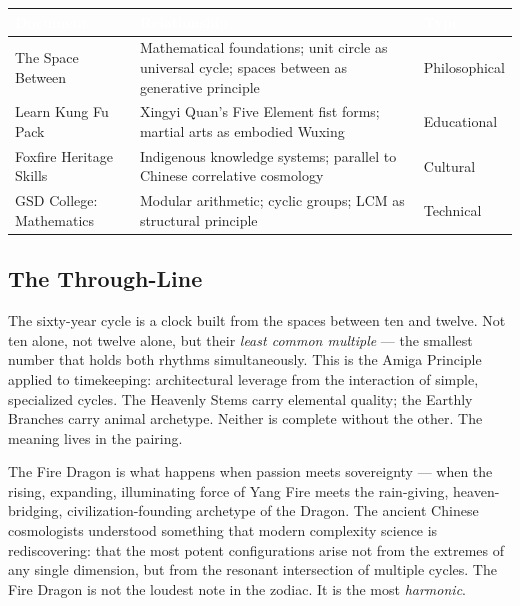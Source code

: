 \documentclass[11pt,letterpaper]{article}
\newcommand{\stageheader}[2]{%
  \noindent\colorbox{#2}{\makebox[\textwidth][l]{%
    \textcolor{white}{\bfseries\sffamily\hspace{6pt}#1\hspace{6pt}}}}%
  \vspace{0.5em}\par%
}
\newcommand{\tableheader}[1]{\textbf{\sffamily\textcolor{white}{#1}}}
\begin{document}
\begin{center}
\begin{tabularx}{\textwidth}{L{4cm}XC{2.5cm}}
\toprule
{}
\tableheader{Document} & \tableheader{Relationship} & \tableheader{Type} \\
\midrule
The Space Between & Mathematical foundations; unit circle as universal cycle; spaces between as generative principle & Philosophical \\
Learn Kung Fu Pack & Xingyi Quan's Five Element fist forms; martial arts as embodied Wuxing & Educational \\
Foxfire Heritage Skills & Indigenous knowledge systems; parallel to Chinese correlative cosmology & Cultural \\
GSD College: Mathematics & Modular arithmetic; cyclic groups; LCM as structural principle & Technical \\
\bottomrule
\end{tabularx}
\end{center}

\subsection{The Through-Line}

The sixty-year cycle is a clock built from the spaces between ten and twelve. Not ten alone, not twelve alone, but their \emph{least common multiple} --- the smallest number that holds both rhythms simultaneously. This is the Amiga Principle applied to timekeeping: architectural leverage from the interaction of simple, specialized cycles. The Heavenly Stems carry elemental quality; the Earthly Branches carry animal archetype. Neither is complete without the other. The meaning lives in the pairing.

The Fire Dragon is what happens when passion meets sovereignty --- when the rising, expanding, illuminating force of Yang Fire meets the rain-giving, heaven-bridging, civilization-founding archetype of the Dragon. The ancient Chinese cosmologists understood something that modern complexity science is rediscovering: that the most potent configurations arise not from the extremes of any single dimension, but from the resonant intersection of multiple cycles. The Fire Dragon is not the loudest note in the zodiac. It is the most \emph{harmonic}.

\newpage
\stageheader{STAGE 2 --- RESEARCH REFERENCE}{secondary}
\end{document}
